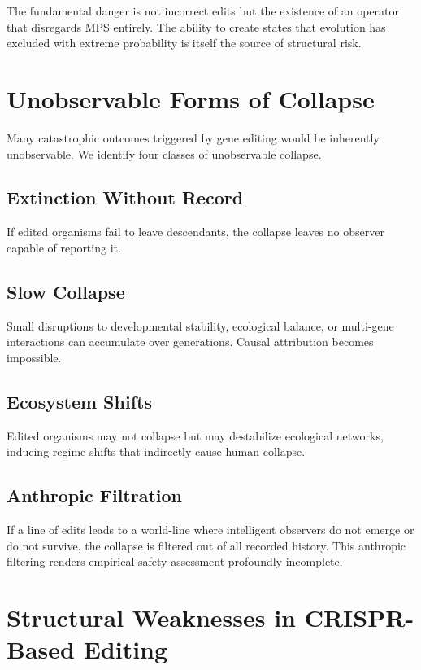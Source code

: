 \documentclass[11pt]{article}
\begin{document}
The fundamental danger is not incorrect edits but the existence of an operator that disregards MPS entirely. The ability to create states that evolution has excluded with extreme probability is itself the source of structural risk.

\section{Unobservable Forms of Collapse}

Many catastrophic outcomes triggered by gene editing would be inherently unobservable. We identify four classes of unobservable collapse.

\subsection{Extinction Without Record}

If edited organisms fail to leave descendants, the collapse leaves no observer capable of reporting it.

\subsection{Slow Collapse}

Small disruptions to developmental stability, ecological balance, or multi-gene interactions can accumulate over generations. Causal attribution becomes impossible.

\subsection{Ecosystem Shifts}

Edited organisms may not collapse but may destabilize ecological networks, inducing regime shifts that indirectly cause human collapse.

\subsection{Anthropic Filtration}

If a line of edits leads to a world-line where intelligent observers do not emerge or do not survive, the collapse is filtered out of all recorded history. This anthropic filtering renders empirical safety assessment profoundly incomplete.

\section{Structural Weaknesses in CRISPR-Based Editing}
\end{document}
